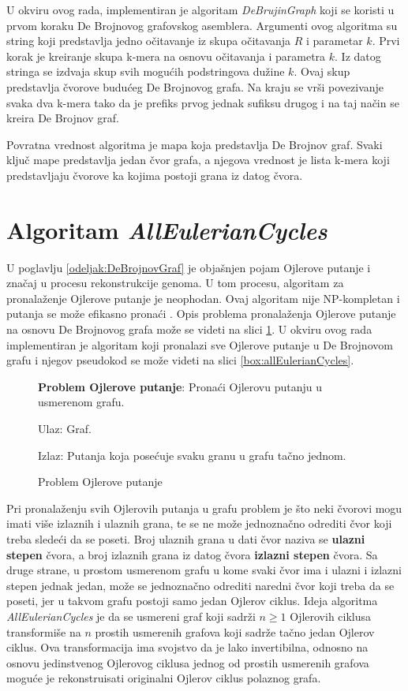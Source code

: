 \documentclass[12pt,oneside]{memoir}
\begin{document}
U okviru ovog rada, implementiran je algoritam \textit{DeBrujinGraph} koji se koristi u prvom koraku De Brojnovog grafovskog asemblera. Argumenti ovog algoritma su string koji predstavlja jedno očitavanje iz skupa očitavanja $R$ i parametar $k$. Prvi korak je kreiranje skupa k-mera na osnovu očitavanja i parametra $k$. Iz datog stringa se izdvaja skup svih mogućih podstringova dužine $k$. Ovaj skup predstavlja čvorove budućeg De Brojnovog grafa. Na kraju se vrši povezivanje svaka dva k-mera tako da je prefiks prvog jednak sufiksu drugog i na taj način se kreira De Brojnov graf.

Povratna vrednost algoritma je mapa koja predstavlja De Brojnov graf. Svaki ključ mape predstavlja jedan čvor grafa, a njegova vrednost je lista k-mera koji predstavljaju čvorove ka kojima postoji grana iz datog čvora.

\section{Algoritam \textit{AllEulerianCycles}}

U poglavlju \ref{odeljak:DeBrojnovGraf} je objašnjen pojam  Ojlerove putanje i značaj u procesu rekonstrukcije genoma. U tom procesu, algoritam za pronalaženje Ojlerove putanje je neophodan. Ovaj algoritam nije NP-kompletan i putanja se može efikasno pronaći \cite{skriptaBio}. Opis problema pronalaženja Ojlerove putanje na osnovu De Brojnovog grafa može se videti na slici \ref{box:Ojler}. U okviru ovog rada implementiran je algoritam koji pronalazi sve Ojlerove putanje u De Brojnovom grafu i njegov pseudokod se može videti na slici \ref{box:allEulerianCycles}. 
\vspace{0.2cm}

\begin{figure}[!ht]
\begin{tcolorbox}
\textbf{Problem Ojlerove putanje}: Pronaći Ojlerovu putanju u usmerenom grafu.

Ulaz: Graf.

Izlaz: Putanja koja posećuje svaku granu u grafu tačno jednom.
\end{tcolorbox}
\caption{Problem Ojlerove putanje}
\label{box:Ojler}
\end{figure}

Pri pronalaženju svih Ojlerovih putanja u grafu problem je što neki čvorovi mogu imati više izlaznih i ulaznih grana, te se ne može jednoznačno odrediti čvor koji treba sledeći da se poseti. Broj ulaznih grana u dati čvor naziva se \textbf{ulazni stepen} čvora, a broj izlaznih grana iz datog čvora \textbf{izlazni stepen} čvora. Sa druge strane, u prostom usmerenom grafu u kome svaki čvor ima i ulazni i izlazni stepen jednak jedan, može se jednoznačno odrediti naredni čvor koji treba da se poseti, jer u takvom grafu postoji samo jedan Ojlerov ciklus. Ideja algoritma \textit{AllEulerianCycles} je da se usmereni graf koji sadrži $n \geq 1$ Ojlerovih ciklusa transformiše na $n$ prostih usmerenih grafova koji sadrže tačno jedan Ojlerov ciklus. Ova transformacija ima svojstvo da je lako invertibilna, odnosno na osnovu jedinstvenog Ojlerovog ciklusa jednog od prostih usmerenih grafova moguće je rekonstruisati originalni Ojlerov ciklus polaznog grafa.
\end{document}

